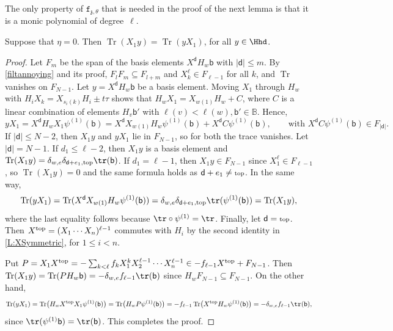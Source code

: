 \documentclass[a4paper,11pt]{amsart}
\newcommand{\Tr}{\op{Tr}}
\numberwithin{equation}{subsection}
\theoremstyle{definition}
\theoremstyle{theorem}
\theoremstyle{remark}
\newcommand\charge{{\mathfrak{z}}}
\newcommand\fct{\mathtt{f}_{\charge,\theta}}
\newcommand\ELL{\text{\scriptsize top}}%
\newcommand\bd{\mathsf{d}}
\newcommand\bb{\mathsf{b}}
\newcommand\op{\operatorname}
\newcommand{\Bo}{\mathbb{B}}
\begin{document}
The only property of $\fct$ that is needed in the proof of the next
lemma is that it is a monic polynomial of degree~$\ell$.

\begin{Lemma}\label{L:XoneEtaZero}
Suppose that $\eta=0$. Then $\Tr(X_1y)=\Tr(yX_1)$, for all $y\in\Hhd$.
\end{Lemma}
\begin{proof}
Let $F_m$ be the span of the basis elements $X^\bd H_w\bb$ with
$|\bd|\leq m$. By \autoref{filtannoying} and its proof, $F_lF_m\subseteq
F_{l+m}$ and $X_k^\ell\in F_{\ell-1}$ for all $k$, and $\Tr$ vanishes on
$F_{N-1}$. Let $y=X^\bd H_w\bb$ be a basis element. Moving $X_1$ through
$H_w$ with $H_iX_k=X_{s_i(k)}H_i\pm t\tau$ shows that
$H_wX_1=X_{w(1)}H_w+C$, where $C$ is a linear combination of elements
$H_v\bb'$ with $\ell(v)<\ell(w), \bb'\in\Bo$. Hence,
\[
 yX_1=X^\bd H_wX_1\psi^{(1)}(\bb)=X^\bd X_{w(1)}H_w\psi^{(1)}(\bb)+X^\bd C\psi^{(1)}(\bb),\qquad \text{with } X^\bd C\psi^{(1)}(\bb)\in F_{|\bd|}.
\]
If $|\bd|\leq N-2$, then $X_1y$ and $yX_1$ lie in $F_{N-1}$, so for both the
trace vanishes. Let $|\bd|=N-1$. If $d_1\leq\ell-2$, then $X_1y$ is a
basis element and
$\Tr(X_1y)=\delta_{w,e}\delta_{\bd+e_1,\ELL}\tr(\bb)$. If
$d_1=\ell-1$, then $X_1y\in F_{N-1}$ since $X_1^\ell\in F_{\ell-1}$, so
$\Tr(X_1y)=0$ and the same formula holds as
$\bd+e_1\neq\ELL$. In the same way,
\[
    \Tr(yX_1)=\Tr(X^\bd X_{w(1)}H_w\psi^{(1)}(\bb))=\delta_{w,e}\delta_{\bd+e_1,\ELL}\tr(\psi^{(1)}(\bb))
    =\Tr(X_1y),
\]
where the last equality follows because $\tr\circ\psi^{(1)}=\tr$.
Finally, let $\bd=\ELL$. Then $X^{\ELL}=(X_1\cdots X_n)^{\ell-1}$
commutes with $H_i$ by the second identity in \autoref{L:XSymmetric}, for $1\le i<n$.

Put $P=X_1X^{\ELL}=-\sum_{k<\ell}f_kX_1^kX_2^{\ell-1}\cdots
X_n^{\ell-1}\in-f_{\ell-1}X^{\ELL}+F_{N-1}$. Then
$\Tr(X_1y)=\Tr(PH_w\bb)=-\delta_{w,e}f_{\ell-1}\tr(\bb)$ since
$H_wF_{N-1}\subseteq F_{N-1}$. On the other hand,
\[
 \Tr(yX_1)=\Tr\bigl(H_wX^{\ELL}X_1\psi^{(1)}(\bb)\bigr)=\Tr\bigl(H_wP\psi^{(1)}(\bb)\bigr)=-f_{\ell-1}\Tr\bigl(X^{\ELL}H_w\psi^{(1)}(\bb)\bigr)=-\delta_{w,e}f_{\ell-1}\tr(\bb),
\]
since $\tr(\psi^{(1)}\bb)=\tr(\bb)$. This completes the proof.
\end{proof}
\end{document}
